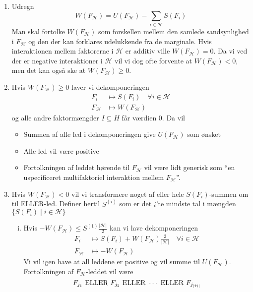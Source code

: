 \documentclass[a4paper, 12pt]{article}
\begin{document}
\begin{enumerate}
\item
Udregn 
\begin{equation}
W(F_{\mathcal H})=U(F_{\mathcal H})- \sum_{i\in \mathcal H} S(F_i)
\end{equation}
Man skal fortolke $W(F_{\mathcal H})$ som forskellen mellem den samlede sandsynlighed i $F_{\mathcal H}$ og den der kan forklares udelukkende fra de marginale. Hvis interaktionen mellem faktorerne i $\mathcal H$ er additiv ville $W(F_{\mathcal H})=0$. Da vi ved der er negative interaktioner i $\mathcal H$ vil vi dog ofte forvente at $W(F_{\mathcal H})<0$, men det kan også ske at $W(F_{\mathcal H})\geq 0$. 
\item
Hvis $W(F_{\mathcal H})\geq 0$ laver vi dekomponeringen
\begin{align}
F_i &\mapsto S(F_i) \quad \forall i \in \mathcal H\\
F_{\mathcal H} &\mapsto W(F_{\mathcal H})
\end{align}
og alle andre faktormængder $I\subseteq H$ får værdien 0. Da vil 
\begin{itemize}
\item
Summen af alle led i dekomponeringen give $U(F_{\mathcal H})$ som ønsket
\item
Alle led vil være positive
\item
Fortolkningen af leddet hørende til $F_{\mathcal H}$ vil være lidt generisk som ``en uspecificeret multifaktoriel interaktion mellem $F_{\mathcal H}$''.
\end{itemize}
\item
Hvis $W(F_{\mathcal H})<0$ vil vi transformere noget af eller hele $S(F_i)$-summen om til ELLER-led. Definer hertil $S^{(i)}$ som er det $i$'te mindste tal i mængden $\{S(F_i)\mid i \in \mathcal H\}$
\begin{enumerate}[(i)]
\item
Hvis $-W(F_{\mathcal H})\leq S^{(1)}\frac{|\mathcal H|}{2}$ kan vi lave dekomponeringen
\begin{align}
F_i &\mapsto S(F_i) + W(F_{\mathcal H})\frac{2}{|\mathcal H|} \quad \forall i\in \mathcal H\\
F_{\mathcal H}&\mapsto -W(F_{\mathcal H})
\end{align}
Vi vil igen have at all leddene er positive og vil summe til $U(F_{\mathcal H})$. Fortolkningen af $F_{\mathcal H}$-leddet vil være 
\begin{equation}
F_{j_1} \textup{ ELLER } F_{j_2} \textup{ ELLER } \cdots \textup{ ELLER } F_{j_{|\mathcal H|}} 

\end{equation}
\end{enumerate}
\end{enumerate}
\end{document}

